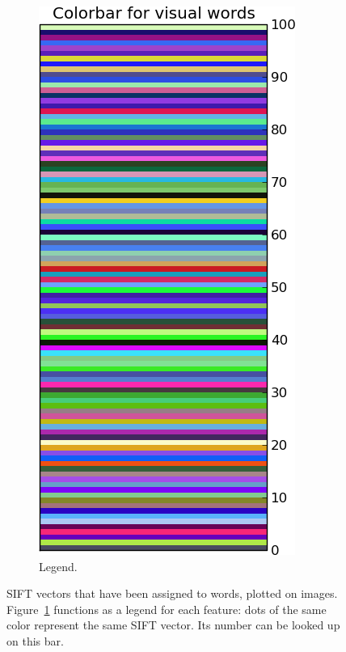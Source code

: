 \documentclass[a4paper,10pt,twoside]{article}
\begin{document}
\begin{figure}
\begin{subfigure}{0.49\textwidth}
    \includegraphics[width=\textwidth,height=.3\textheight,keepaspectratio]{colorbar}
    \caption{Legend.}
    \label{sfig:colorbar}
  \end{subfigure}
  \caption{SIFT vectors that have been assigned to words, plotted on images.  Figure~\ref{sfig:colorbar} functions as a legend for each feature: dots of the same color represent the same SIFT vector.  Its number can be looked up on this bar.}
  \label{fig:wordsonimage}
\end{figure}
\end{document}
